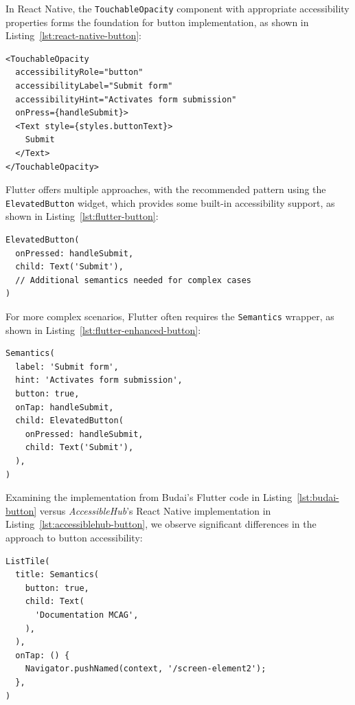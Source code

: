 In React Native, the \texttt{TouchableOpacity} component with appropriate accessibility properties forms the foundation for button implementation, as shown in Listing~\ref{lst:react-native-button}:

\begin{lstlisting}[style=ReactNativeStyle, caption=Accessible button in React Native, label=lst:react-native-button]
<TouchableOpacity
  accessibilityRole="button"
  accessibilityLabel="Submit form"
  accessibilityHint="Activates form submission"
  onPress={handleSubmit}>
  <Text style={styles.buttonText}>
    Submit
  </Text>
</TouchableOpacity>
\end{lstlisting}

Flutter offers multiple approaches, with the recommended pattern using the \texttt{ElevatedButton} widget, which provides some built-in accessibility support, as shown in Listing~\ref{lst:flutter-button}:

\begin{lstlisting}[style=DartStyle, caption=Accessible button in Flutter, label=lst:flutter-button]
ElevatedButton(
  onPressed: handleSubmit,
  child: Text('Submit'),
  // Additional semantics needed for complex cases
)
\end{lstlisting}

For more complex scenarios, Flutter often requires the \texttt{Semantics} wrapper, as shown in Listing~\ref{lst:flutter-enhanced-button}:

\begin{lstlisting}[style=DartStyle, caption=Enhanced button accessibility in Flutter, label=lst:flutter-enhanced-button]
Semantics(
  label: 'Submit form',
  hint: 'Activates form submission',
  button: true,
  onTap: handleSubmit,
  child: ElevatedButton(
    onPressed: handleSubmit,
    child: Text('Submit'),
  ),
)
\end{lstlisting}

\pagebreak

Examining the implementation from Budai's Flutter code in Listing~\ref{lst:budai-button} versus \textit{AccessibleHub}'s React Native implementation in Listing~\ref{lst:accessiblehub-button}, we observe significant differences in the approach to button accessibility:

\begin{lstlisting}[style=DartStyle, caption=Budai's Flutter implementation of accessible buttons, label=lst:budai-button]
ListTile(
  title: Semantics(
    button: true,
    child: Text(
      'Documentation MCAG',
    ),
  ),
  onTap: () {
    Navigator.pushNamed(context, '/screen-element2');
  },
)
\end{lstlisting}

